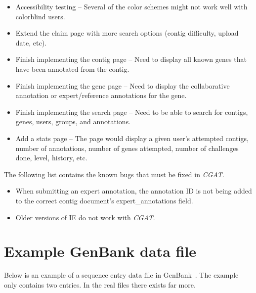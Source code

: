 \documentclass[12pt]{ucthesis}
\begin{document}
\begin{itemize}
\item Accessibility testing -- Several of the color schemes might not work well with colorblind users.
\item Extend the claim page with more search options (contig difficulty, upload date, etc).
\item Finish implementing the contig page -- Need to display all known genes that have been annotated from
the contig.
\item Finish implementing the gene page -- Need to display the collaborative annotation or expert/reference
annotations for the gene.
\item Finish implementing the search page -- Need to be able to search for contigs, genes, users, groups, and
annotations.
\item Add a stats page -- The page would display a given user's attempted contigs, number of annotations, number of genes attempted, number of challenges done, level, history, etc.
\end{itemize}

The following list contains the known bugs that must be fixed in \textit{CGAT}.
\begin{itemize}
\item When submitting an expert annotation, the annotation ID is not being added to the correct contig document's expert\_annotations field.
\item Older versions of IE do not work with \textit{CGAT}.
\end{itemize}




\clearpage



\newpage

\appendix
\chapter{Example GenBank data file}
\label{app:genbank_data_file}

Below is an example of a sequence entry data file in GenBank~\cite{genbank_195}. The example only contains two entries. In the real files there exists far more.
\end{document}
